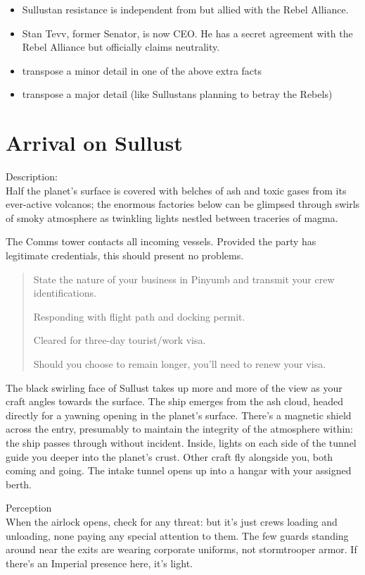 \documentclass{book}
\begin{document}
\begin{multicols}{2}
\begin{itemize}
    \item \advantage Sullustan resistance is independent from but allied with the Rebel Alliance.
    \item \triumph Stan Tevv, former Senator, is now CEO.  He has a secret agreement with the Rebel Alliance but officially claims neutrality.
    \item \threat transpose a minor detail in one of the above extra facts
    \item \despair transpose a major detail (like Sullustans planning to betray the Rebels)
\end{itemize}


\section{Arrival on Sullust}

Description:\\
Half the planet’s surface is covered with belches of ash and toxic gases from its ever-active volcanos; the enormous factories below can be glimpsed through swirls of smoky atmosphere as twinkling lights nestled between traceries of magma.

The Comms tower contacts all incoming vessels.  Provided the party has legitimate credentials, this should present no problems.

\begin{quote}
State the nature of your business in Pinyumb and transmit your crew identifications.

Responding with flight path and docking permit.

Cleared for three-day tourist/work visa. 

Should you choose to remain longer, you’ll need to renew your visa.
\end{quote}

The black swirling face of Sullust takes up more and more of the view as your craft angles towards the surface. The ship emerges from the ash cloud, headed directly for a yawning opening in the planet’s surface. There’s a magnetic shield across the entry, presumably to maintain the integrity of the atmosphere within: the ship passes through without incident. Inside, lights on each side of the tunnel guide you deeper into the planet’s crust. Other craft fly alongside you, both coming and going. The intake tunnel opens up into a hangar with your assigned berth.

\difficulty \difficulty Perception \\
When the airlock opens, check for any threat: but it’s just crews loading and unloading, none paying any special attention to them. The few guards standing around near the exits are wearing corporate uniforms, not stormtrooper armor. If there’s an Imperial presence here, it’s light.


\end{multicols}
\end{document}
